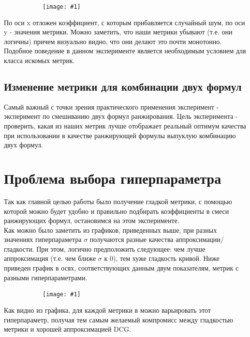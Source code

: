 \documentclass[14pt,a4paper]{amsart}
\theoremstyle{definition}
\theoremstyle{definition}
\newcommand{\incpic}[1]{
\begin{figure}[!h]
    \centering
    \begin{subfigure}{\textwidth}
    \centering
        \texttt{[image: \#1]}
    \end{subfigure}
\end{figure}
}
\begin{document}
\incpic{noised_metrics}

По оси x отложен коэффициент, с которым прибавляется случайный шум, по оси y - значения метрики. Можно заметить, что наши метрики убывают (т.е. они логичны) причем визуально видно, что они делают это почти монотонно. \\

Подобное поведение в данном эксперименте является необходимым условием для класса искомых метрик.


\subsection{Изменение метрики для комбинации двух формул}


Самый важный с точки зрения практического применения эксперимент - эксперимент по смешиванию двух формул ранжирования. Цель эксперимента - проверить, какая из наших метрик лучше отображает реальный оптимум качества при использовании в качестве ранжирующей формулы выпуклую комбинацию двух формул.



\newpage
\section{Проблема выбора гиперпараметра}

Так как главной целью работы было получение гладкой метрики, с помощью которой можно будет удобно и правильно подбирать коэффициенты в смеси ранжирующих формул, остановимся на этом эксперименте. \\

Как можно было заметить из графиков, приведенных выше, при разных значениях гиперпараметра $\sigma$ получаются разные качества аппроксимации/гладкости. При этом, логично предположить следующее: чем лучше аппроксимация (т.е. чем ближе $\sigma$ к 0), тем хуже гладкость кривой. Ниже приведен график в осях, соответствующих данным двум показателям, метрик с разными гиперпараметрами.

\incpic{tradeoff_max_min}

Как видно из графика, для каждой метрики в можно варьировать этот гиперпараметр, получая тем самым желаемый компромисс между гладкостью метрики и хорошей аппроксимацией DCG. \\
\end{document}
